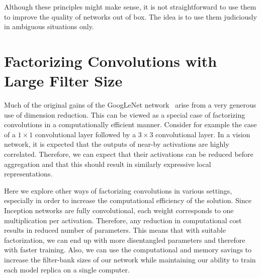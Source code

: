 \documentclass[10pt,twocolumn,letterpaper]{article}
\begin{document}
Although these principles might make sense, it is not straightforward to use
them to improve the quality of networks out of box. The idea is to use them
judiciously in ambiguous situations only.
 \section{Factorizing Convolutions with Large Filter Size}

Much of the original gains of the  GoogLeNet network~\cite{szegedy2015going}
arise from a very generous use of dimension reduction. This can be viewed
as a special case of factorizing convolutions in a computationally efficient
manner. Consider for example the case of a $1\times 1$ convolutional layer
followed by a $3\times 3$ convolutional layer.
In a vision network, it is expected that the outputs
of near-by activations are highly correlated. Therefore,
we can expect that their activations can be reduced before
aggregation and that this should result in
similarly expressive local representations.

Here we explore other
ways of factorizing convolutions in various settings, especially in order to
increase the computational efficiency of the solution. Since Inception networks
are fully convolutional, each weight corresponds to one multiplication per
activation. Therefore, any reduction in computational cost results in reduced
number of parameters. This means that with suitable factorization, we can end up
with more disentangled parameters and therefore with faster training.
Also, we can use the computational and memory savings to increase the
filter-bank sizes of our network while maintaining our ability to train
each model replica on a single computer.
\end{document}
